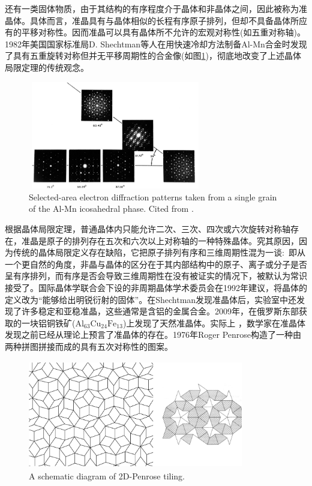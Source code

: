 还有一类固体物质，由于其结构的有序程度介于晶体和非晶体之间，因此被称为准晶体。具体而言，准晶具有与晶体相似的长程有序原子排列，但却不具备晶体所应有的平移对称性。因而准晶可以具有晶体所不允许的宏观对称性(如五重对称轴)。%
1982年美国国家标准局D. Shechtman等人在用快速冷却方法制备Al-Mn合金时发现了具有五重旋转对称但并无平移周期性的合金像(如图\ref{Fig:SSI-03})，彻底地改变了上述晶体局限定理的传统观念。
\begin{figure}[h!]
\centering
\vspace*{-0.1in}
\includegraphics[height=1.85in,width=3.0in,viewport=0 0 791 504,clip]{Figures/quasicrystal.png}
\caption{\small \textrm{Selected-area electron diffraction patterns taken from a single grain of the Al-Mn icosahedral phase. Cited from .}}%
\label{Fig:SSI-03}
\end{figure}
根据晶体局限定理，普通晶体内只能允许二次、三次、四次或六次旋转对称轴存在，准晶是原子的排列存在五次和六次以上对称轴的一种特殊晶体。究其原因，因为传统的晶体局限定义存在缺陷，它把原子排列有序和三维周期性混为一谈:~即从一个更自然的角度，非晶与晶体的区分在于其内部结构中的原子、离子或分子是否呈有序排列，而有序是否会导致三维周期性在没有被证实的情况下，被默认为常识接受了。国际晶体学联合会下设的非周期晶体学术委员会在1992年建议，将晶体的定义改为``能够给出明锐衍射的固体''。在Shechtman发现准晶体后，实验室中还发现了许多稳定和亚稳准晶，这些通常是含铝的金属合金。2009年，在俄罗斯东部获取的一块铝铜铁矿($\mathrm{Al}_{63}\mathrm{Cu}_{24}\mathrm{Fe}_{13}$)上发现了天然准晶体。实际上 ，数学家在准晶体发现之前已经从理论上预言了准晶体的存在。1976年Roger Penrose构造了一种由两种拼图拼接而成的具有五次对称性的图案。
\begin{figure}[h!]
\centering
\vspace*{-0.1in}
\includegraphics[height=1.85in,width=3.7in,viewport=0 0 1931 939,clip]{Figures/Penrose-puzzle.png}
\caption{\small \textrm{A schematic diagram of 2D-Penrose tiling.}}%
\label{Fig:Penrose-puzzle}
\end{figure}
